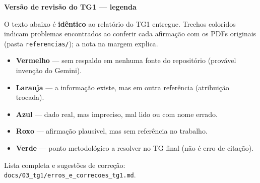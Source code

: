 \documentclass[12pt,openany]{report}
\begin{document}
\thispagestyle{empty}
\begin{center}{\Large\bfseries Versão de revisão do TG1 — legenda}\end{center}
\vspace{0.5cm}
\noindent O texto abaixo é \textbf{idêntico} ao relatório do TG1 entregue. Trechos coloridos indicam problemas
encontrados ao conferir cada afirmação com os PDFs originais (pasta \texttt{referencias/}); a nota na margem explica.
\begin{itemize}
  \item \textcolor{revVerm}{\textbf{Vermelho} — sem respaldo em nenhuma fonte do repositório (provável invenção do Gemini).}
  \item \textcolor{revLar}{\textbf{Laranja} — a informação existe, mas em outra referência (atribuição trocada).}
  \item \textcolor{revAzul}{\textbf{Azul} — dado real, mas impreciso, mal lido ou com nome errado.}
  \item \textcolor{revRoxo}{\textbf{Roxo} — afirmação plausível, mas sem referência no trabalho.}
  \item \textcolor{revVerde}{\textbf{Verde} — ponto metodológico a resolver no TG final (não é erro de citação).}
\end{itemize}
\noindent Lista completa e sugestões de correção: \texttt{docs/03\_tg1/erros\_e\_correcoes\_tg1.md}.
\newpage
\end{document}

